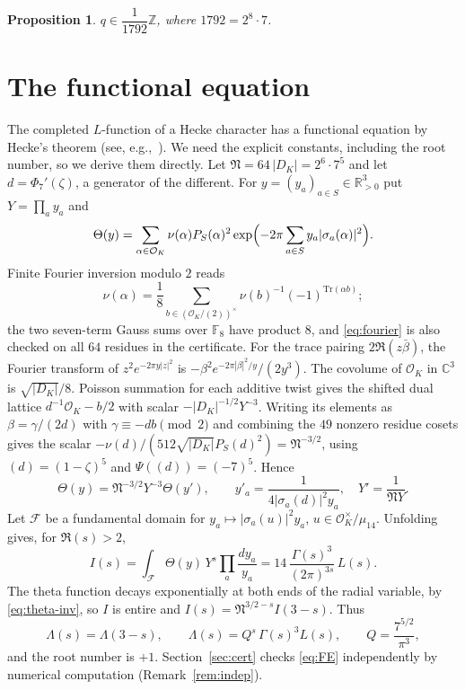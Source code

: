 \documentclass[11pt]{amsart}
\newtheorem{proposition}[theorem]{Proposition}
\theoremstyle{remark}
\theoremstyle{definition}
\newcommand{\Z}{\mathbb{Z}}
\newcommand{\R}{\mathbb{R}}
\newcommand{\C}{\mathbb{C}}
\newcommand{\F}{\mathbb{F}}
\newcommand{\OK}{\mathcal{O}_K}
\newcommand{\Tr}{\mathrm{Tr}}
\newcommand{\Fund}{\mathcal{F}}
\newcommand{\Cond}{\mathfrak{N}}
\begin{document}
\begin{proposition}\label{prop:denominator}
$q\in\dfrac{1}{1792}\Z$, where $1792=2^8\cdot7$.
\end{proposition}

\section{The functional equation}\label{sec:FE}

The completed $L$-function of a Hecke character has a functional equation by Hecke's theorem (see, e.g.,~\cite[Ch.~VII]{Neukirch}). We need the explicit constants, including the root number, so we derive them directly. Let $\Cond=64\,|D_K|=2^6\cdot7^5$ and let $d=\Phi_7'(\zeta)$, a generator of the different. For $y=(y_a)_{a\in S}\in\R^3_{>0}$ put $Y=\prod_ay_a$ and
\[
\Theta(y)=\sum_{\alpha\in\OK}\nu(\alpha)P_S(\alpha)^2\exp\Bigl(-2\pi\sum_{a\in S}y_a|\sigma_a(\alpha)|^2\Bigr).
\]
Finite Fourier inversion modulo $2$ reads
\begin{equation}\label{eq:fourier}
\nu(\alpha)=\frac18\sum_{b\in(\OK/(2))^\times}\nu(b)^{-1}(-1)^{\Tr(\alpha b)};
\end{equation}
the two seven-term Gauss sums over $\F_8$ have product $8$, and \eqref{eq:fourier} is also checked on all $64$ residues in the certificate. For the trace pairing $2\Re(z\bar\beta)$, the Fourier transform of $z^2e^{-2\pi y|z|^2}$ is $-\beta^2e^{-2\pi|\beta|^2/y}/(2y^3)$. The covolume of $\OK$ in $\C^3$ is $\sqrt{|D_K|}/8$. Poisson summation for each additive twist gives the shifted dual lattice $d^{-1}\OK-b/2$ with scalar $-|D_K|^{-1/2}Y^{-3}$. Writing its elements as $\beta=\gamma/(2d)$ with $\gamma\equiv-db\pmod2$ and combining the $49$ nonzero residue cosets gives the scalar $-\nu(d)/(512\sqrt{|D_K|}P_S(d)^2)=\Cond^{-3/2}$, using $(d)=(1-\zeta)^5$ and $\Psi((d))=(-7)^5$. Hence
\begin{equation}\label{eq:theta-inv}
\Theta(y)=\Cond^{-3/2}Y^{-3}\Theta(y'),\qquad y'_a=\frac{1}{4|\sigma_a(d)|^2y_a},\quad Y'=\frac{1}{\Cond Y}.
\end{equation}
Let $\Fund$ be a fundamental domain for $y_a\mapsto|\sigma_a(u)|^2y_a$, $u\in\OK^\times/\mu_{14}$. Unfolding gives, for $\Re(s)>2$,
\[
I(s)=\int_\Fund\Theta(y)\,Y^s\prod_a\frac{dy_a}{y_a}=14\,\frac{\Gamma(s)^3}{(2\pi)^{3s}}\,L(s).
\]
The theta function decays exponentially at both ends of the radial variable, by \eqref{eq:theta-inv}, so $I$ is entire and $I(s)=\Cond^{3/2-s}I(3-s)$. Thus
\begin{equation}\label{eq:FE}
\Lambda(s)=\Lambda(3-s),\qquad \Lambda(s)=Q^s\,\Gamma(s)^3L(s),\qquad Q=\frac{7^{5/2}}{\pi^3},
\end{equation}
and the root number is $+1$. Section~\ref{sec:cert} checks \eqref{eq:FE} independently by numerical computation (Remark~\ref{rem:indep}).
\end{document}
